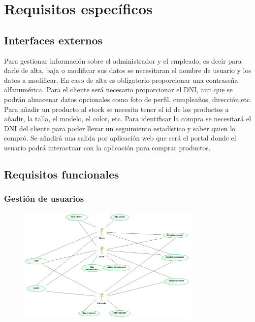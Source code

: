 \section{Requisitos específicos}
\label{sec:req_esp}
\subsection{Interfaces externos}
Para gestionar información sobre el administrador y el empleado, es decir para darle de alta, baja o modificar sus datos se necesitaran el nombre de usuario y los datos a modificar. En caso de alta es obligatorio proporcionar una contraseña alfanumérica.
Para el cliente será necesario proporcionar el DNI, aun que se podrán almacenar datos opcionales como foto de perfil, cumpleaños, dirección,etc.
Para añadir un producto al stock se necesita tener el id de los productos a añadir, la talla, el modelo, el color, etc.
Para identificar la compra se necesitará el DNI del cliente para poder llevar un seguimiento estadístico y saber quien lo compró.
Se añadirá una salida por aplicación web que será el portal donde el usuario podrá interactuar con la aplicación para comprar productos.
\subsection{Requisitos funcionales}
\subsubsection{Gestión de usuarios}%
\begin{figure}[H]
    \centering
    \includegraphics[width = 0.8\textwidth]{Use_Cases/Gestion_Usuarios.png}
\end{figure}
\newpage
